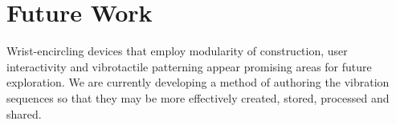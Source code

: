 \documentclass{chi-ext}
\begin{document}




\section{Future Work}
Wrist-encircling devices that employ modularity of construction, user interactivity and vibrotactile patterning appear promising areas for future exploration. We are currently developing a method of authoring the vibration sequences so that they may be more effectively created, stored, processed and shared. 
\end{document}
